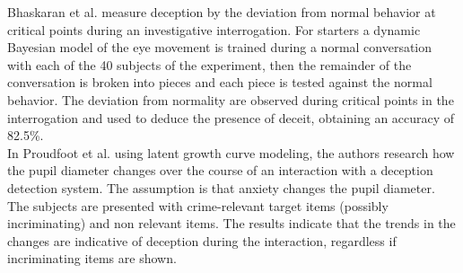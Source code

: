 Bhaskaran et al. measure deception by the deviation from normal behavior \cite{5771407} at critical points during an investigative interrogation. For starters a dynamic Bayesian model of the eye movement is trained during a normal conversation with each of the 40 subjects of the experiment, then the remainder of the conversation is broken into pieces and each piece is tested against the normal behavior. The deviation from normality are observed during critical points in the interrogation and used to deduce the presence of deceit, obtaining an accuracy of 82.5\%. \\
In \cite{7165946} Proudfoot et al. using latent growth curve modeling, the authors research how the pupil diameter changes over the course of an interaction with a deception detection system. The assumption is that anxiety changes the pupil diameter. The subjects are presented with crime-relevant target items (possibly incriminating) and non relevant items. The results indicate that the trends in the changes are indicative of deception during the interaction, regardless if incriminating items are shown. \\

